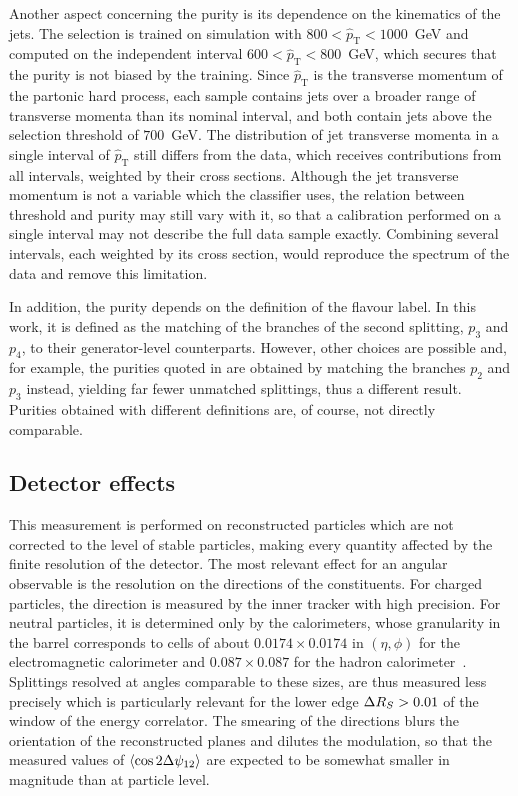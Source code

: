Another aspect concerning the purity is its dependence on the kinematics of the jets.
The selection is trained on simulation with
$800 < \hat{p}_{\mathrm{T}} < 1000$~GeV and computed on the independent interval
$600 < \hat{p}_{\mathrm{T}} < 800$~GeV, which secures that the purity is not
biased by the training. Since $\hat{p}_{\mathrm{T}}$ is the transverse
momentum of the partonic hard process, each sample contains jets over a broader range
of transverse momenta than its nominal interval, and both contain jets above the selection threshold of $700$~GeV.
The distribution of jet
transverse momenta in a single interval of $\hat{p}_{\mathrm{T}}$ still differs
from the data, which receives contributions from all intervals, weighted by their cross sections.
Although the jet transverse momentum is not a variable which the classifier uses, 
the relation between threshold and purity may
still vary with it, so that a calibration performed on a single interval may not
describe the full data sample exactly. Combining several intervals, each weighted
by its cross section, would reproduce the spectrum of the data and remove this
limitation.

In addition, the purity depends on the definition of the flavour label. In this work, it is defined
as the matching of the branches of the second splitting, $p_3$ and
$p_4$, to their generator-level counterparts. However, other choices are possible and, for 
example, the purities quoted in \cite{CMS:2026jnt} are obtained by matching the branches 
$p_2$ and $p_3$ instead, yielding far fewer unmatched splittings, thus a different result.
Purities obtained with different definitions are, of course, not directly
comparable. 

\subsection{Detector effects}
\label{sec:sys-detector}

This measurement is performed on reconstructed particles which are not corrected to the level
of stable particles, making every quantity affected by the finite resolution of the detector.
The most relevant effect for an angular observable is the resolution on the directions of the
constituents. For charged particles, the direction is measured by the inner tracker with high precision.
For neutral particles, it is determined only by the calorimeters, whose granularity in
the barrel corresponds to cells of about $0.0174 \times 0.0174$ in $(\eta,\phi)$ for
the electromagnetic calorimeter and $0.087 \times 0.087$ for the hadron
calorimeter~\cite{CMS:2008}. Splittings resolved at angles comparable to these sizes,
are thus measured less precisely which is particularly relevant for the lower
edge $\Delta R_S > 0.01$ of the window of the energy correlator. The smearing of the
directions blurs the orientation of the reconstructed planes and dilutes the
modulation, so that the measured values of $\langle \cos 2\Delta\psi_{12} \rangle$ are
expected to be somewhat smaller in magnitude than at particle level.

